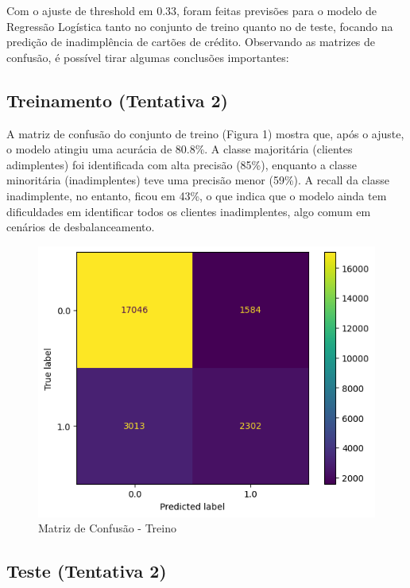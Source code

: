 \documentclass{abntpuc}
\begin{document}
Com o ajuste de threshold em 0.33, foram feitas previsões para o modelo de Regressão Logística tanto no conjunto de treino quanto no de teste, focando na predição de inadimplência de cartões de crédito. Observando as matrizes de confusão, é possível tirar algumas conclusões importantes:

\subsection*{\centering\Large\textbf{Treinamento (Tentativa 2)}}

A matriz de confusão do conjunto de treino (Figura 1) mostra que, após o ajuste, o modelo atingiu uma acurácia de 80.8\%. A classe majoritária (clientes adimplentes) foi identificada com alta precisão (85\%), enquanto a classe minoritária (inadimplentes) teve uma precisão menor (59\%). A recall da classe inadimplente, no entanto, ficou em 43\%, o que indica que o modelo ainda tem dificuldades em identificar todos os clientes inadimplentes, algo comum em cenários de desbalanceamento.

\begin{figure}[H]
    \centering
    \includegraphics[width=\textwidth]{grafico7.png}
    \caption{Matriz de Confusão - Treino}
    \centering
\end{figure}

\subsection*{\centering\Large\textbf{Teste (Tentativa 2)}}
\end{document}
